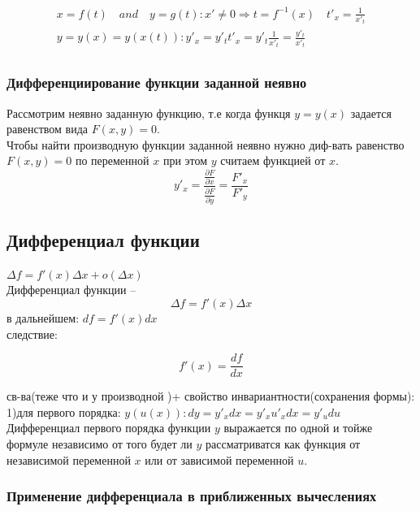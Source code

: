 \documentclass[a4paper, 12pt]{article}
\begin{document}
\begin{align*}
  x = f(t) \quad and \quad y = g(t): x' \neq 0 \Rightarrow t = f^{-1}(x) \quad  t'_x = \frac{1}{x'_t}\\
  y = y(x) = y(x(t)) :  y'_x = y'_t  t'_x=y'_t  \frac{1}{x'_t} = \frac{y'_t}{x'_t}\\
\end{align*}


\subsubsection{Дифференциирование функции заданной неявно}

Рассмотрим неявно заданную функцию, т.е когда функця  $ y = y(x)  $ задается равенством вида $ F(x,y) = 0 $.\\
Чтобы найти производную функции заданной неявно нужно диф-вать равенство $ F(x,y) = 0 $ по переменной $ x $ при этом $ y $ считаем функцией от $ x $.\\

\[
        y'_x = \frac{\frac{\partial F}{\partial x}}{\frac{\partial F}{\partial y}} = \frac{F'_x}{F'_y}
      \]      

\subsection{Дифференциал функции}

$ \Delta f = f'(x) \Delta x + o(\Delta x) $\\

Дифференциал функции -- \[
  \Delta f = f'(x) \Delta x
\]
в дальнейшем: $ df = f'(x) dx $\\
следствие:

\[
  f'(x) = \frac{df}{dx}   
 \] 

св-ва(теже что и у производной )+ свойство инвариантности(сохранения формы):\\
1)для первого порядка: $ y(u(x)): dy = y'_x dx=y'_x u'_x dx = y'_u du $ \\
Дифференциал первого порядка функции $ y $  выражается по одной и тойже формуле независимо от того будет ли $ y $ рассматриватся как функция от независимой переменной $ x $ или от зависимой переменной $ u $.\\


\subsubsection{Применение дифференциала в приближенных вычеслениях}
\end{document}
